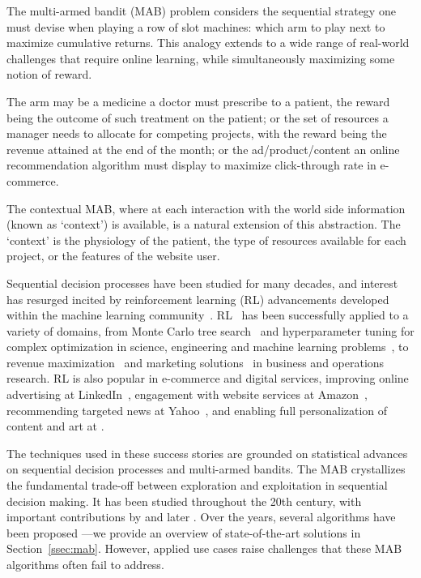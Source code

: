 
The multi-armed bandit (MAB) problem considers
the sequential strategy one must devise when playing a row of slot machines:
\ie which arm to play next to maximize cumulative returns.
This analogy extends to a wide range of real-world challenges
that require online learning, while simultaneously maximizing some notion of reward. 

The arm may be a medicine a doctor must prescribe to a patient,
the reward being the outcome of such treatment on the patient;
or the set of resources a manager needs to allocate for competing projects,
with the reward being the revenue attained at the end of the month;
or the ad/product/content an online recommendation algorithm must display
to maximize click-through rate in e-commerce.

The contextual MAB,
where at each interaction with the world
side information (known as `context') is available,
is a natural extension of this abstraction.
The `context' is the physiology of the patient,
the type of resources available for each project,
or the features of the website user.

Sequential decision processes have been studied for many decades, %
and interest has resurged
incited by reinforcement learning (RL) advancements developed within the machine learning community~\citep{j-Mnih2015,j-Silver2017}.
RL~\citep{b-Sutton1998} has been successfully applied to a variety of domains,
from Monte Carlo tree search~\citep{ic-Bai2013} and hyperparameter tuning for complex optimization in science, engineering and machine learning problems~\citep{ip-Kandasamy2018, Urteaga2023},
to revenue maximization~\citep{j-Ferreira2018} and marketing solutions~\citep{j-Schwartz2017} in business and operations research.
RL is also popular in e-commerce and digital services,
improving online advertising at LinkedIn~\citep{ip-Agarwal2013},
engagement with website services at Amazon~\citep{ip-Hill2017},
recommending targeted news at Yahoo~\citep{ip-Li2010},
and enabling full personalization of content and art at \citet{Netflix2017}.

The techniques used in these success stories are grounded on statistical advances on sequential decision processes and multi-armed bandits.
The MAB crystallizes the fundamental trade-off between exploration and exploitation in sequential decision making.
It has been studied throughout the 20th century, with important contributions
by \citet{j-Thompson1935} and later \citet{j-Robbins1952}.
Over the years, several algorithms have been proposed ---we provide an overview of state-of-the-art solutions in Section~\ref{ssec:mab}.
However, applied use cases raise challenges that these MAB algorithms often fail to address.

